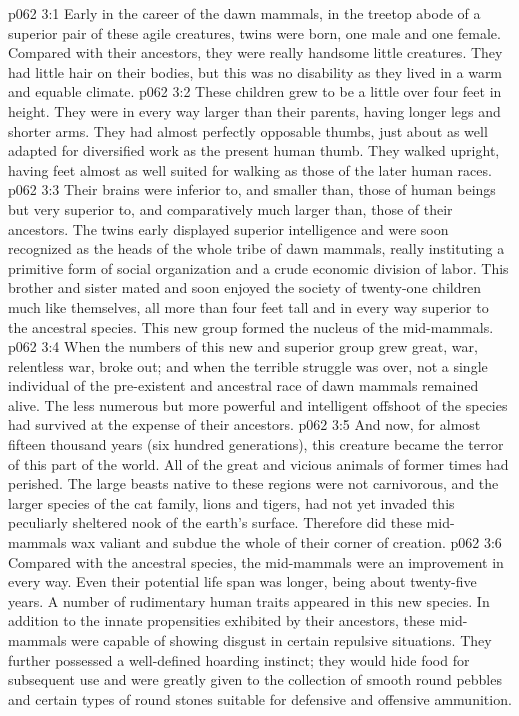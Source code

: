 \vs p062 3:1 Early in the career of the dawn mammals, in the treetop abode of a superior pair of these agile creatures, twins were born, one male and one female. Compared with their ancestors, they were really handsome little creatures. They had little hair on their bodies, but this was no disability as they lived in a warm and equable climate.
\vs p062 3:2 These children grew to be a little over four feet in height. They were in every way larger than their parents, having longer legs and shorter arms. They had almost perfectly opposable thumbs, just about as well adapted for diversified work as the present human thumb. They walked upright, having feet almost as well suited for walking as those of the later human races.
\vs p062 3:3 Their brains were inferior to, and smaller than, those of human beings but very superior to, and comparatively much larger than, those of their ancestors. The twins early displayed superior intelligence and were soon recognized as the heads of the whole tribe of dawn mammals, really instituting a primitive form of social organization and a crude economic division of labor. This brother and sister mated and soon enjoyed the society of twenty\hyp{}one children much like themselves, all more than four feet tall and in every way superior to the ancestral species. This new group formed the nucleus of the mid\hyp{}mammals.
\vs p062 3:4 When the numbers of this new and superior group grew great, war, relentless war, broke out; and when the terrible struggle was over, not a single individual of the pre\hyp{}existent and ancestral race of dawn mammals remained alive. The less numerous but more powerful and intelligent offshoot of the species had survived at the expense of their ancestors.
\vs p062 3:5 And now, for almost fifteen thousand years (six hundred generations), this creature became the terror of this part of the world. All of the great and vicious animals of former times had perished. The large beasts native to these regions were not carnivorous, and the larger species of the cat family, lions and tigers, had not yet invaded this peculiarly sheltered nook of the earth’s surface. Therefore did these mid\hyp{}mammals wax valiant and subdue the whole of their corner of creation.
\vs p062 3:6 \pc Compared with the ancestral species, the mid\hyp{}mammals were an improvement in every way. Even their potential life span was longer, being about twenty\hyp{}five years. A number of rudimentary human traits appeared in this new species. In addition to the innate propensities exhibited by their ancestors, these mid\hyp{}mammals were capable of showing disgust in certain repulsive situations. They further possessed a well\hyp{}defined hoarding instinct; they would hide food for subsequent use and were greatly given to the collection of smooth round pebbles and certain types of round stones suitable for defensive and offensive ammunition.
